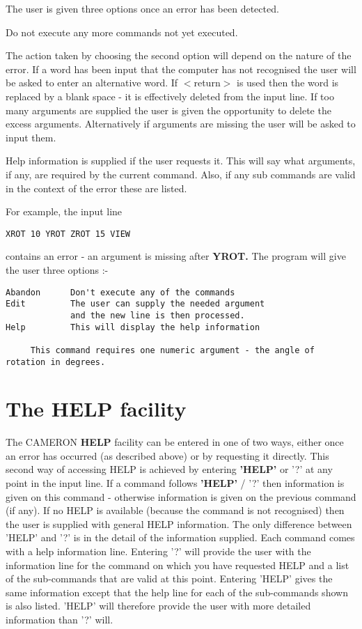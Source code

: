 \documentclass[10pt,a4paper]{report}
\begin{document}
The user is given three options once an error has been detected.


\bigskip{}


Do not execute any more commands not yet executed.


\bigskip{}


The action taken by choosing the second option will depend on the nature of
the error. If a word
has been input that the computer has not recognised the user will be
asked to enter an alternative word. If $<$return$>$ is used then the
word is replaced by a blank space - it is effectively deleted from the
input line. If too many arguments are supplied the user is given the
opportunity to delete the
excess arguments. Alternatively if arguments are missing the user will
be asked to input them.


\bigskip{}




Help information is supplied if the user requests it. This will say
what arguments, if any,
are required by the current command. Also, if any sub commands are valid
in the context of the error these are listed.


For example, the input line
\small\begin{verbatim}
XROT 10 YROT ZROT 15 VIEW
\end{verbatim}\normalsize


contains an error - an argument is missing after {\bf YROT.} The program will
give the user three options :-
\small\begin{verbatim}
Abandon      Don't execute any of the commands
Edit         The user can supply the needed argument
             and the new line is then processed.
Help         This will display the help information

     This command requires one numeric argument - the angle of rotation in degrees.
\end{verbatim}\normalsize


\section{The HELP facility}


The CAMERON {\bf HELP} facility can be entered in one of two ways, either
once an error has occurred (as described above) or by requesting it
directly. This second way of accessing HELP is achieved by entering {\bf 'HELP'}
or '?' at any point in the input line. If a command follows {\bf 'HELP'} / '?' then
information is given on this command - otherwise information is given on
the previous command (if any). If no HELP is available (because the
command is not recognised) then the user is supplied with general HELP
information. The only difference between 'HELP' and '?' is in the detail of
the information supplied. Each command comes with a help information
line. Entering '?' will provide the user with the information line for the
command on which you have requested HELP and a list of the sub-commands
that are valid at this point. Entering 'HELP' gives the same information
except that the help line for each of the sub-commands shown is also
listed. 'HELP' will therefore provide the user with more detailed
information than '?' will.
\end{document}
